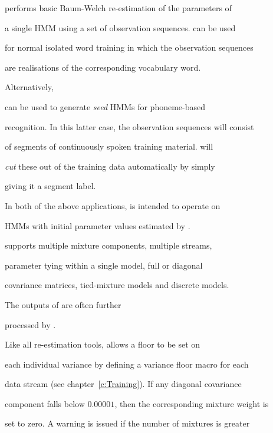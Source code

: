  performs basic Baum-Welch re-estimation of the parameters of


a single HMM using a set of observation sequences.   can be used


for normal isolated word training in which the observation sequences


are realisations of the corresponding vocabulary word.  





Alternatively,


 can be used to generate \textit{seed} HMMs for phoneme-based


recognition.  In this latter case, the observation sequences will consist


of segments of continuously spoken training material.   will


\textit{cut} these out of the training data automatically by simply


giving it a segment label.





In both of the above applications,  is intended to operate on


HMMs with initial parameter values estimated by .





 supports multiple mixture components, multiple streams,


parameter tying within a single model, full or diagonal


covariance matrices, tied-mixture models and discrete models.  


The outputs of  are often further 


processed by .





Like all re-estimation tools,  allows a floor to  be set on


each individual variance by defining a variance floor macro for each


data stream (see chapter~\ref{c:Training}).  If any diagonal covariance


component falls below $0.00001$, then the corresponding mixture weight is


set to zero.  A warning is issued if the number of mixtures is greater


